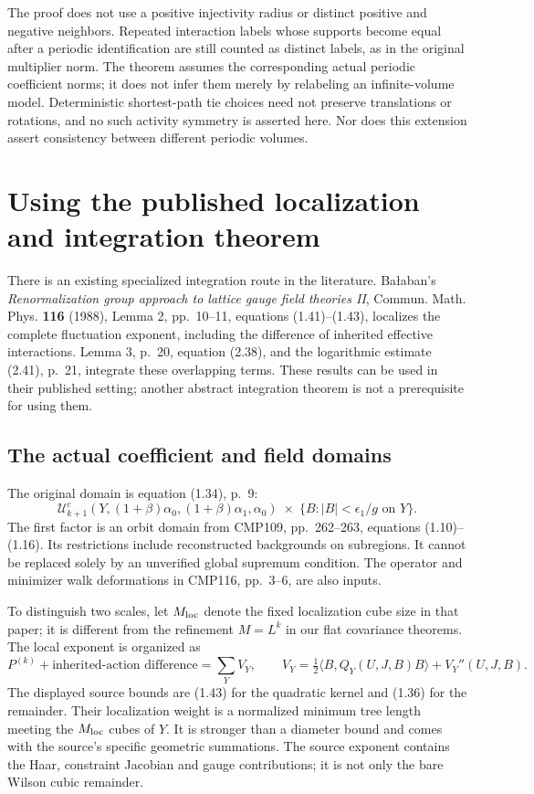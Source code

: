 \documentclass[11pt]{article}
\theoremstyle{remark}
\begin{document}
The proof does not use a positive injectivity radius or distinct positive
and negative neighbors. Repeated interaction labels whose supports become
equal after a periodic identification are still counted as distinct labels,
as in the original multiplier norm. The theorem assumes the corresponding
actual periodic coefficient norms; it does not infer them merely by
relabeling an infinite-volume model. Deterministic shortest-path tie choices
need not preserve translations or rotations, and no such activity symmetry
is asserted here. Nor does this extension assert consistency between
different periodic volumes.

\section{Using the published localization and integration theorem}
\label{ib-section}

There is an existing specialized integration route in the literature.
Ba\l aban's \emph{Renormalization group approach to lattice gauge
field theories II}, Commun. Math. Phys. \textbf{116} (1988),
Lemma 2, pp.~10--11, equations (1.41)--(1.43), localizes the
complete fluctuation exponent, including the difference of inherited
effective interactions. Lemma 3, p.~20, equation (2.38), and the
logarithmic estimate (2.41), p.~21, integrate these overlapping
terms. These results can be used in their published setting;
another abstract integration theorem is not a prerequisite for
using them.

\subsection{The actual coefficient and field domains}

The original domain is equation (1.34), p.~9:
\[
 \mathcal U^c_{k+1}
   (Y,(1+\beta)\alpha_0,(1+\beta)\alpha_1,\alpha_0)
       \;\times\;
 \{B:|B|<\epsilon_1/g\text{ on }Y\}.
\]
The first factor is an orbit domain from CMP109, pp.~262--263,
equations (1.10)--(1.16). Its restrictions include reconstructed
backgrounds on subregions. It cannot be replaced solely by an
unverified global supremum condition. The operator and minimizer
walk deformations in CMP116, pp.~3--6, are also inputs.

To distinguish two scales, let $M_{\rm loc}$ denote the fixed
localization cube size in that paper; it is different from the
refinement $M=L^k$ in our flat covariance theorems. The local
exponent is organized as
\[
 P^{(k)}+\text{inherited-action difference}=\sum_Y V_Y,
 \qquad
 V_Y=\tfrac12\langle B,Q_Y(U,J,B)B\rangle+V_Y''(U,J,B).
\]
The displayed source bounds are (1.43) for the quadratic kernel
and (1.36) for the remainder. Their localization weight is a
normalized minimum tree length meeting the $M_{\rm loc}$ cubes
of $Y$. It is stronger than a diameter bound and comes with
the source's specific geometric summations. The source exponent
contains the Haar, constraint Jacobian and gauge contributions;
it is not only the bare Wilson cubic remainder.
\end{document}
